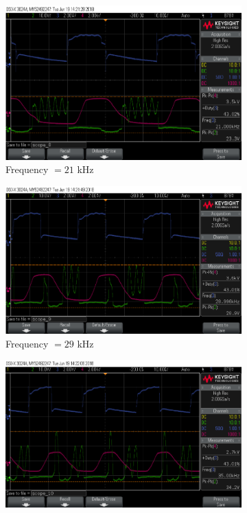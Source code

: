 \documentclass[11pt]{article}
\begin{document}
\begin{figure}[h!]
\centering
\begin{subfigure}{0.47\textwidth}
\centering
\includegraphics[width = \textwidth]{thruster_sc_31}
\caption{Frequency $= 21$ kHz}
\label{fig:thruster_sc_31}
\end{subfigure}
\begin{subfigure}{0.49\textwidth}
\centering
\includegraphics[width = \textwidth]{thruster_sc_33}
\caption{Frequency $= 29$ kHz}
\label{fig:thruster_sc_33}
\end{subfigure}
\begin{subfigure}{0.49\textwidth}
\centering
\includegraphics[width = \textwidth]{thruster_sc_32}

\end{subfigure}
\end{figure}
\end{document}
